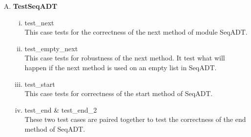 \documentclass[12pt]{article}
\begin{document}
\renewcommand{\labelenumii}{\Roman{enumii}}
\renewcommand{\labelenumi}{\Alph{enumi}}
\begin{enumerate}[A.]
\item \textbf{TestSeqADT}

\begin{enumerate}[i)]
\item test\_next\\
This case tests for the correctness of the next method of module SeqADT.
\item test\_empty\_next\\
This case tests for robustness of the next method. It test what will happen if the next method is used on an empty list in SeqADT.
\item test\_start\\
This case tests for correctness of the start method of SeqADT.
\item test\_end \& test\_end\_2\\
These two test cases are paired together to test the correctness of the end method of SeqADT.
\end{enumerate}


\end{enumerate}
\end{document}
